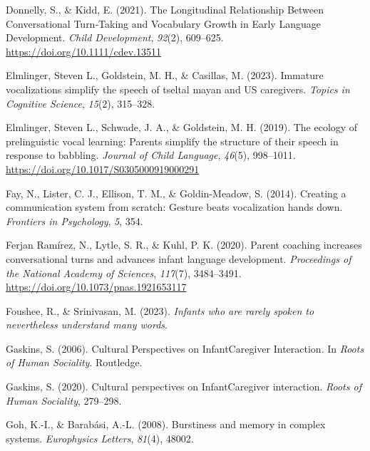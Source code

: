 \documentclass[
  man]{apa6}
\newlength{\cslhangindent}
\newlength{\cslentryspacingunit} %
\newenvironment{CSLReferences}[2] %
 {%
  \setlength{\parindent}{0pt}
  \ifodd #1
  \let\oldpar\par
  \def\par{\hangindent=\cslhangindent\oldpar}
  \fi
  \setlength{\parskip}{#2\cslentryspacingunit}
 }%
 {}
\begin{document}
\begin{CSLReferences}{1}{0}
\leavevmode{}%
Donnelly, S., \& Kidd, E. (2021). The {Longitudinal} {Relationship} {Between} {Conversational} {Turn}‐{Taking} and {Vocabulary} {Growth} in {Early} {Language} {Development}. \emph{Child Development}, \emph{92}(2), 609--625. \url{https://doi.org/10.1111/cdev.13511}

\leavevmode{}%
Elmlinger, Steven L., Goldstein, M. H., \& Casillas, M. (2023). Immature vocalizations simplify the speech of tseltal mayan and US caregivers. \emph{Topics in Cognitive Science}, \emph{15}(2), 315--328.

\leavevmode{}%
Elmlinger, Steven L., Schwade, J. A., \& Goldstein, M. H. (2019). The ecology of prelinguistic vocal learning: Parents simplify the structure of their speech in response to babbling. \emph{Journal of Child Language}, \emph{46}(5), 998--1011. \url{https://doi.org/10.1017/S0305000919000291}

\leavevmode{}%
Fay, N., Lister, C. J., Ellison, T. M., \& Goldin-Meadow, S. (2014). Creating a communication system from scratch: Gesture beats vocalization hands down. \emph{Frontiers in Psychology}, \emph{5}, 354.

\leavevmode{}%
Ferjan Ramírez, N., Lytle, S. R., \& Kuhl, P. K. (2020). Parent coaching increases conversational turns and advances infant language development. \emph{Proceedings of the National Academy of Sciences}, \emph{117}(7), 3484--3491. \url{https://doi.org/10.1073/pnas.1921653117}

\leavevmode{}%
Foushee, R., \& Srinivasan, M. (2023). \emph{Infants who are rarely spoken to nevertheless understand many words}.

\leavevmode{}%
Gaskins, S. (2006). Cultural {Perspectives} on {InfantCaregiver} {Interaction}. In \emph{Roots of {Human} {Sociality}}. Routledge.

\leavevmode{}%
Gaskins, S. (2020). Cultural perspectives on InfantCaregiver interaction. \emph{Roots of Human Sociality}, 279--298.

\leavevmode{}%
Goh, K.-I., \& Barabási, A.-L. (2008). Burstiness and memory in complex systems. \emph{Europhysics Letters}, \emph{81}(4), 48002.


\end{CSLReferences}
\end{document}
